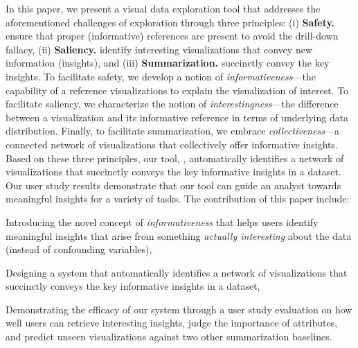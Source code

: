 \par In this paper, we present a visual data exploration tool that addresses the aforementioned challenges of exploration through three principles: (i) \textbf{Safety.} ensure that proper (informative) references are present to avoid the drill-down fallacy, (ii)  \textbf{Saliency.} identify interesting visualizations that convey new information (insights), and (iii) \textbf{Summarization.} succinctly convey the key insights. To facilitate safety, we develop a notion of \emph{informativeness}---the capability of a reference visualizations to explain the visualization of interest. To facilitate saliency, we characterize the notion of \emph{interestingness}---the difference between a visualization and its informative reference in terms of underlying data distribution. Finally, to facilitate summarization, we embrace \emph{collectiveness}---a connected network of visualizations that collectively offer informative insights. Based on these three principles, our tool, \system, automatically identifies a network of visualizations that succinctly conveys the key informative insights in a dataset. Our user study results demonstrate that our tool can guide an analyst towards meaningful insights for a variety of tasks. The contribution of this paper include:
\begin{denselist}
\item Introducing the novel concept of \emph{informativeness} that helps users identify meaningful insights that arise from something \textit{actually interesting} about the data (instead of confounding variables),
\item Designing a system that automatically identifies a network of visualizations that succinctly conveys the key informative insights in a dataset,
\item Demonstrating the efficacy of our system through a user study evaluation on how well users can retrieve interesting insights, judge the importance of attributes, and predict unseen visualizations against two other summarization baselines.
\end{denselist}